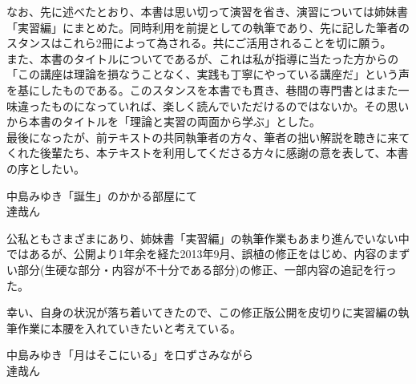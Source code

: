 なお、先に述べたとおり、本書は思い切って演習を省き、演習については姉妹書「実習編」にまとめた。同時利用を前提としての執筆であり、先に記した筆者のスタンスはこれら2冊によって為される。共にご活用されることを切に願う。\\

また、本書のタイトルについてであるが、これは私が指導に当たった方からの「この講座は理論を損なうことなく、実践も丁寧にやっている講座だ」という声を基にしたものである。このスタンスを本書でも貫き、巷間の専門書とはまた一味違ったものになっていれば、楽しく読んでいただけるのではないか。その思いから本書のタイトルを「理論と実習の両面から学ぶ」とした。\\

最後になったが、前テキストの共同執筆者の方々、筆者の拙い解説を聴きに来てくれた後輩たち、本テキストを利用してくださる方々に感謝の意を表して、本書の序としたい。
\begin{flushright}
中島みゆき「誕生」のかかる部屋にて\\
達哉ん
\end{flushright}

公私ともさまざまにあり、姉妹書「実習編」の執筆作業もあまり進んでいない中ではあるが、公開より1年余を経た2013年9月、誤植の修正をはじめ、内容のまずい部分(生硬な部分・内容が不十分である部分)の修正、一部内容の追記を行った。

幸い、自身の状況が落ち着いてきたので、この修正版公開を皮切りに実習編の執筆作業に本腰を入れていきたいと考えている。
\begin{flushright}
中島みゆき「月はそこにいる」を口ずさみながら\\
達哉ん
\end{flushright}
